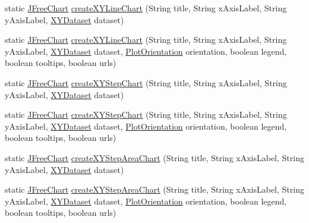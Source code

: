 \begin{DoxyCompactItemize}
\item 
static \mbox{\hyperlink{classorg_1_1jfree_1_1chart_1_1_j_free_chart}{J\+Free\+Chart}} \mbox{\hyperlink{classorg_1_1jfree_1_1chart_1_1_chart_factory_ab0ccb060d9bac7a6dedfb231a356e767}{create\+X\+Y\+Line\+Chart}} (String title, String x\+Axis\+Label, String y\+Axis\+Label, \mbox{\hyperlink{interfaceorg_1_1jfree_1_1data_1_1xy_1_1_x_y_dataset}{X\+Y\+Dataset}} dataset)
\item 
static \mbox{\hyperlink{classorg_1_1jfree_1_1chart_1_1_j_free_chart}{J\+Free\+Chart}} \mbox{\hyperlink{classorg_1_1jfree_1_1chart_1_1_chart_factory_ab4e88b9eeeb4a3cf34e75a078abc4a1f}{create\+X\+Y\+Line\+Chart}} (String title, String x\+Axis\+Label, String y\+Axis\+Label, \mbox{\hyperlink{interfaceorg_1_1jfree_1_1data_1_1xy_1_1_x_y_dataset}{X\+Y\+Dataset}} dataset, \mbox{\hyperlink{classorg_1_1jfree_1_1chart_1_1plot_1_1_plot_orientation}{Plot\+Orientation}} orientation, boolean legend, boolean tooltips, boolean urls)
\item 
static \mbox{\hyperlink{classorg_1_1jfree_1_1chart_1_1_j_free_chart}{J\+Free\+Chart}} \mbox{\hyperlink{classorg_1_1jfree_1_1chart_1_1_chart_factory_aab77cd183c8a3af4e5b880a0e69de244}{create\+X\+Y\+Step\+Chart}} (String title, String x\+Axis\+Label, String y\+Axis\+Label, \mbox{\hyperlink{interfaceorg_1_1jfree_1_1data_1_1xy_1_1_x_y_dataset}{X\+Y\+Dataset}} dataset)
\item 
static \mbox{\hyperlink{classorg_1_1jfree_1_1chart_1_1_j_free_chart}{J\+Free\+Chart}} \mbox{\hyperlink{classorg_1_1jfree_1_1chart_1_1_chart_factory_a232cb207c09040578b3e4c13b1d53161}{create\+X\+Y\+Step\+Chart}} (String title, String x\+Axis\+Label, String y\+Axis\+Label, \mbox{\hyperlink{interfaceorg_1_1jfree_1_1data_1_1xy_1_1_x_y_dataset}{X\+Y\+Dataset}} dataset, \mbox{\hyperlink{classorg_1_1jfree_1_1chart_1_1plot_1_1_plot_orientation}{Plot\+Orientation}} orientation, boolean legend, boolean tooltips, boolean urls)
\item 
static \mbox{\hyperlink{classorg_1_1jfree_1_1chart_1_1_j_free_chart}{J\+Free\+Chart}} \mbox{\hyperlink{classorg_1_1jfree_1_1chart_1_1_chart_factory_a1d43236d7157159f117e1ca689a18ad0}{create\+X\+Y\+Step\+Area\+Chart}} (String title, String x\+Axis\+Label, String y\+Axis\+Label, \mbox{\hyperlink{interfaceorg_1_1jfree_1_1data_1_1xy_1_1_x_y_dataset}{X\+Y\+Dataset}} dataset)
\item 
static \mbox{\hyperlink{classorg_1_1jfree_1_1chart_1_1_j_free_chart}{J\+Free\+Chart}} \mbox{\hyperlink{classorg_1_1jfree_1_1chart_1_1_chart_factory_abfd580295406c03bd456d6d78148c624}{create\+X\+Y\+Step\+Area\+Chart}} (String title, String x\+Axis\+Label, String y\+Axis\+Label, \mbox{\hyperlink{interfaceorg_1_1jfree_1_1data_1_1xy_1_1_x_y_dataset}{X\+Y\+Dataset}} dataset, \mbox{\hyperlink{classorg_1_1jfree_1_1chart_1_1plot_1_1_plot_orientation}{Plot\+Orientation}} orientation, boolean legend, boolean tooltips, boolean urls)

\end{DoxyCompactItemize}
